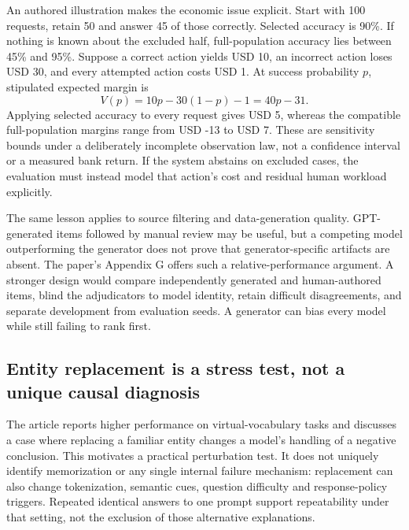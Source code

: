 An authored illustration makes the economic issue explicit. Start with 100 requests, retain 50 and answer 45 of those correctly. Selected accuracy is 90\%. If nothing is known about the excluded half, full-population accuracy lies between 45\% and 95\%. Suppose a correct action yields USD 10, an incorrect action loses USD 30, and every attempted action costs USD 1. At success probability $p$, stipulated expected margin is
\begin{equation}
 V(p)=10p-30(1-p)-1=40p-31.
 \label{exec21:check-value}
\end{equation}
Applying selected accuracy to every request gives USD 5, whereas the compatible full-population margins range from USD -13 to USD 7. These are sensitivity bounds under a deliberately incomplete observation law, not a confidence interval or a measured bank return. If the system abstains on excluded cases, the evaluation must instead model that action's cost and residual human workload explicitly.\citep{exec21_causalitycheck_reference}

The same lesson applies to source filtering and data-generation quality. GPT-generated items followed by manual review may be useful, but a competing model outperforming the generator does not prove that generator-specific artifacts are absent. The paper's Appendix G offers such a relative-performance argument. A stronger design would compare independently generated and human-authored items, blind the adjudicators to model identity, retain difficult disagreements, and separate development from evaluation seeds. A generator can bias every model while still failing to rank first.\citep{exec21_causalitycheck}

\subsection{Entity replacement is a stress test, not a unique causal diagnosis}
\label{exec21:check-rename}
The article reports higher performance on virtual-vocabulary tasks and discusses a case where replacing a familiar entity changes a model's handling of a negative conclusion. This motivates a practical perturbation test. It does not uniquely identify memorization or any single internal failure mechanism: replacement can also change tokenization, semantic cues, question difficulty and response-policy triggers. Repeated identical answers to one prompt support repeatability under that setting, not the exclusion of those alternative explanations.\citep{exec21_causalitycheck}

